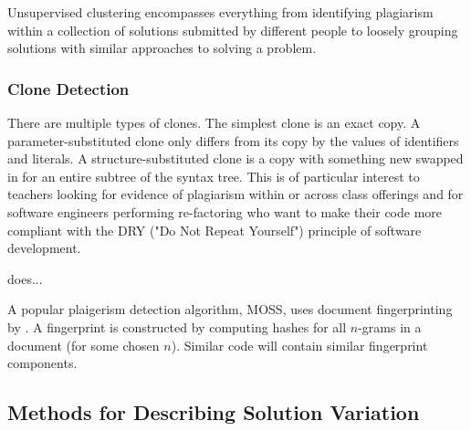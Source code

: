 Unsupervised clustering encompasses everything from identifying plagiarism within a collection of solutions submitted by different people to loosely grouping solutions with similar approaches to solving a problem.

\subsubsection{Clone Detection}
There are multiple types of clones. The simplest clone is an exact copy. A parameter-substituted clone only differs from its copy by the values of identifiers and literals. A structure-substituted clone is a copy with something new swapped in for an entire subtree of the syntax tree. This is of particular interest to teachers looking for evidence of plagiarism within or across class offerings and for software engineers performing re-factoring who want to make their code more compliant with the DRY ("Do Not Repeat Yourself") principle of software development.

\citet{tiarks2011extended} does... 

A popular plaigerism detection algorithm, MOSS, uses  document fingerprinting by \citet{schleimer2003winnowing}. A fingerprint is constructed by computing hashes for all $n$-grams in a document (for some chosen $n$). Similar code will contain similar fingerprint components. 


\subsection{Methods for Describing Solution Variation}

\begin{comment}
Braun and Clarke \cite{thematic06} argue that its application to qualitative data outside psychological research is justified. It is in direct contrast to methods in which a hypothesis or theory is first declared, and then evidence for and against it is gathered from the data. 
\end{comment}

